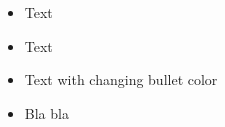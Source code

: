 \documentclass[9pt,aspectratio=169]{beamer}
\begin{document}
\begin{frame}
\begin{itemize}
\item<1-> Text
\item<2-> Text
\item<2-|gray@3-> Text with changing bullet color
\item<4-> Bla bla
\end{itemize}
\end{frame}
\end{document}
